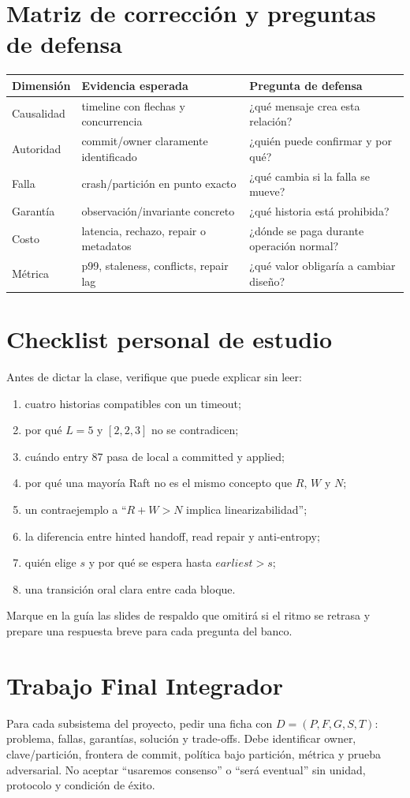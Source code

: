 \documentclass[variant=docente,cover=institutional,mode=screen]{ua-engineering-v6-article}
\begin{document}
\section{Matriz de corrección y preguntas de defensa}
\begin{longtable}{p{}p{}p{}}
\toprule
Dimensión & Evidencia esperada & Pregunta de defensa\\
\midrule
Causalidad & timeline con flechas y concurrencia & ¿qué mensaje crea esta relación?\\
Autoridad & commit/owner claramente identificado & ¿quién puede confirmar y por qué?\\
Falla & crash/partición en punto exacto & ¿qué cambia si la falla se mueve?\\
Garantía & observación/invariante concreto & ¿qué historia está prohibida?\\
Costo & latencia, rechazo, repair o metadatos & ¿dónde se paga durante operación normal?\\
Métrica & p99, staleness, conflicts, repair lag & ¿qué valor obligaría a cambiar diseño?\\
\bottomrule
\end{longtable}

\section{Checklist personal de estudio}
Antes de dictar la clase, verifique que puede explicar sin leer:
\begin{enumerate}
\item cuatro historias compatibles con un timeout;
\item por qué $L=5$ y $[2,2,3]$ no se contradicen;
\item cuándo entry 87 pasa de local a committed y applied;
\item por qué una mayoría Raft no es el mismo concepto que $R$, $W$ y $N$;
\item un contraejemplo a ``$R+W>N$ implica linearizabilidad'';
\item la diferencia entre hinted handoff, read repair y anti-entropy;
\item quién elige $s$ y por qué se espera hasta $earliest>s$;
\item una transición oral clara entre cada bloque.
\end{enumerate}
Marque en la guía las slides de respaldo que omitirá si el ritmo se retrasa y prepare una respuesta breve para cada pregunta del banco.

\section{Trabajo Final Integrador}
Para cada subsistema del proyecto, pedir una ficha con \(D=(P,F,G,S,T)\): problema, fallas, garantías, solución y trade-offs. Debe identificar owner, clave/partición, frontera de commit, política bajo partición, métrica y prueba adversarial. No aceptar “usaremos consenso” o “será eventual” sin unidad, protocolo y condición de éxito.
\end{document}
